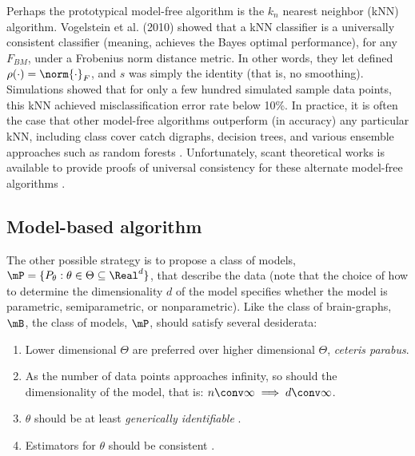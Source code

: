 Perhaps the prototypical model-free algorithm is the $k_n$ nearest neighbor (kNN) algorithm. Vogelstein et al. (2010) showed that a kNN classifier is a universally consistent classifier (meaning, achieves the Bayes optimal performance), for any $F_{BM}$, under a Frobenius norm distance metric. In other words, they let defined $\rho(\cdot)=\norm{\cdot}_F$, and $s$ was simply the identity (that is, no smoothing). Simulations showed that for only a few hundred simulated sample data points, this kNN achieved misclassification error rate below 10\%. In practice, it is often the case that other model-free algorithms outperform (in accuracy) any particular kNN, including class cover catch digraphs, decision trees, and various ensemble approaches such as random forests \cite{Breiman01}. Unfortunately, scant theoretical works is available to provide proofs of universal consistency for these alternate model-free algorithms \cite{?}.



\subsection{Model-based algorithm}  %
\label{sub:model_based_algorithm}

The other possible strategy is to propose a class of models, $\mP=\{P_{\theta} : \theta \in \Theta \subseteq \Real^d\}$, that describe the data (note that the choice of how to determine the dimensionality $d$ of the model specifies whether the model is parametric, semiparametric, or nonparametric).  Like the class of brain-graphs, $\mB$, the class of models, $\mP$, should satisfy several desiderata:

\begin{enumerate}
	\item Lower dimensional $\Theta$ are preferred over higher dimensional $\Theta$, \emph{ceteris parabus}.
	\item As the number of data points approaches infinity, so should the dimensionality of the model, that is:  $n \conv \infty \implies d\conv \infty$.
	\item $\theta$ should be at least \emph{generically identifiable} \cite{AllmanRhodes10}.
	\item Estimators for $\theta$ should be consistent \cite{DGL96}.
\end{enumerate}


